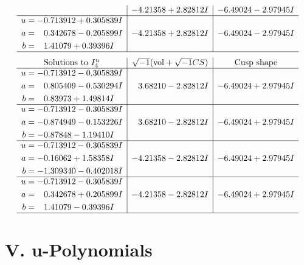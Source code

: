 \documentclass[1p]{elsarticle_modified}
\theoremstyle{definition}
\newcommand{\I}{\sqrt{-1}}
\begin{document}
$$\begin{array}{c|c|c}
 & -4.21358 + 2.82812 I & -6.49024 - 2.97945 I \\ \hline\begin{aligned}
u &= -0.713912 + 0.305839 I \\
a &= \phantom{-}0.342678 - 0.205899 I \\
b &= \phantom{-}1.41079 + 0.39396 I\end{aligned}
 & -4.21358 + 2.82812 I & -6.49024 - 2.97945 I\\
 \hline 
 \end{array}$$\newpage$$\begin{array}{c|c|c}  
\text{Solutions to }I^u_{4}& \I (\text{vol} + \sqrt{-1}CS) & \text{Cusp shape}\\
 \hline 
\begin{aligned}
u &= -0.713912 - 0.305839 I \\
a &= \phantom{-}0.805409 - 0.530294 I \\
b &= \phantom{-}0.83973 + 1.49814 I\end{aligned}
 & \phantom{-}3.68210 - 2.82812 I & -6.49024 + 2.97945 I \\ \hline\begin{aligned}
u &= -0.713912 - 0.305839 I \\
a &= -0.874949 - 0.153226 I \\
b &= -0.87848 - 1.19410 I\end{aligned}
 & \phantom{-}3.68210 - 2.82812 I & -6.49024 + 2.97945 I \\ \hline\begin{aligned}
u &= -0.713912 - 0.305839 I \\
a &= -0.16062 + 1.58358 I \\
b &= -1.309340 - 0.402018 I\end{aligned}
 & -4.21358 - 2.82812 I & -6.49024 + 2.97945 I \\ \hline\begin{aligned}
u &= -0.713912 - 0.305839 I \\
a &= \phantom{-}0.342678 + 0.205899 I \\
b &= \phantom{-}1.41079 - 0.39396 I\end{aligned}
 & -4.21358 - 2.82812 I & -6.49024 + 2.97945 I\\
 \hline 
 \end{array}$$\newpage
\newpage\renewcommand{\arraystretch}{1}
\centering \section*{ V. u-Polynomials}
\end{document}
